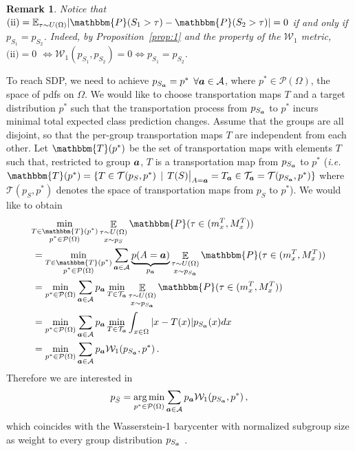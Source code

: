 \documentclass[letterpaper]{article}
\newcommand{\ie}{\emph{i.e.}}
\newtheorem{remark}{Remark}
\theoremstyle{definition}
\newcommand{\W}{\mathcal{W}}
\newcommand{\Sa}{S_{\va}}
\newcommand{\bp}{p_{\bar{S}}}
\begin{document}
\begin{remark}\label{remark:1}
Notice that $\textrm{(ii)}=\mathbb{E}_{\tau\sim U(\Omega)} |\mathbbm{P}(S_1 > \tau) - \mathbbm{P}(S_2 > \tau)| = 0$ if and only if $p_{S_1} = p_{S_2}$. Indeed, by Proposition~\ref{prop:1} and the property of the $\W_1$ metric, $\textrm{(ii)}=0$ $\iff \W_1(p_{S_1}, p_{S_2}) = 0 \iff p_{S_1} = p_{S_2}$.
\end{remark}

To reach SDP, we need to achieve $p_{\Sa} = p^*$ $\forall {\bm{a}} \in \mathcal{A}$, where $p^*\in\mathcal{P}(\Omega)$, the space of pdfs on $\Omega$. We would like to choose transportation maps $T$ and a target distribution $p^*$ such that the transportation process from $p_{\Sa}$ to $p^*$ incurs minimal total expected class prediction changes. Assume that the groups are all disjoint, so that the per-group transportation maps $T$ are independent from each other. Let $\mathbbm{T}(p^*)$ be the set of transportation maps with elements $T$ such that, restricted to group ${\bm{a}}$, $T$ is a transportation map from $p_{\Sa}$ to $p^*$ (\ie~
$\mathbbm{T}(p^*)=\{T\in\mathcal{T}(p_S, p^*) \,\mid\, T(S)\big|_{A=\va} = T_\va\in\mathcal{T}_{\va} = \mathcal{T}(p_{\Sa}, p^*)\}$ 
where $\mathcal{T}(p_S, p^*)$ denotes the space of transportation maps from $p_S$ to $p^*$). We would like to obtain
\begin{align*}
    &\hskip-0.1cm\min_{\substack{T\in\mathbbm{T}(p^*)\\ p^*\in \mathcal{P}(\Omega)}} \mathop{\mathbb{E}}_{\substack{\tau\sim U(\Omega)\\[2pt] x\sim p_S}}\mathbbm{P}(\tau\in(m_x^T, M_x^T))\\
    &=\min_{\substack{T\in\mathbbm{T}(p^*)\\ p^*\in \mathcal{P}(\Omega)}} \sum_{\va\in\mathcal{A}} \underbrace{p(A=\va)}_{p_{\va}}\mathop{\mathbb{E}}_{\substack{\tau\sim U(\Omega)\\[2pt] x\sim p_{\Sa}}}\mathbbm{P}(\tau\in(m_x^T, M_x^T))\\
    & =\min_{p^*\in \mathcal{P}(\Omega)} \sum_{\va\in\mathcal{A}}p_{\va}\min_{T\in\mathcal{T}_{\va}}\mathop{\mathbb{E}}_{\substack{\tau\sim U(\Omega)\\[2pt] x\sim p_{\Sa}}} \mathbbm{P}(\tau\in(m_x^T, M_x^T))\\
    & = \min_{p^*\in \mathcal{P}(\Omega)} \sum_{\va\in\mathcal{A}}p_{\va} \min_{T\in\mathcal{T}_{\va}} \int_{x \in \Omega} |x-T(x)|p_{\Sa}(x)dx\\ %
    & = \min_{p^*\in \mathcal{P}(\Omega)} \sum_{\va\in\mathcal{A}} p_{\va}\W_1(p_{\Sa}, p^*)\,.
\end{align*}
Therefore we are interested in
\begin{align}\label{eq:bar}
\bp = \argmin_{p^* \in \mathcal{P}(\Omega)} \sum_{\va \in \mathcal{A}} p_{\va}\W_1(p_{\Sa}, p^*)\,,
\end{align}
which coincides with the Wasserstein-1 barycenter with normalized subgroup size as weight to every group distribution $p_{\Sa}$ \citep{agueh11barycenters}. 
\end{document}
